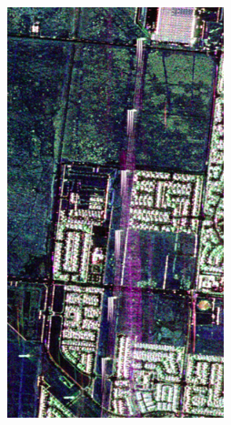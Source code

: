 \begin{figure}[t]
\begin{subfigure}[b]{0.18\columnwidth}
		\includegraphics[width=\textwidth]{Figures/CD/ADD/b}
		\caption{}
\end{subfigure}
\hspace{0.01pt}
\begin{subfigure}[b]{0.18\columnwidth}

\end{subfigure}
\end{figure}
